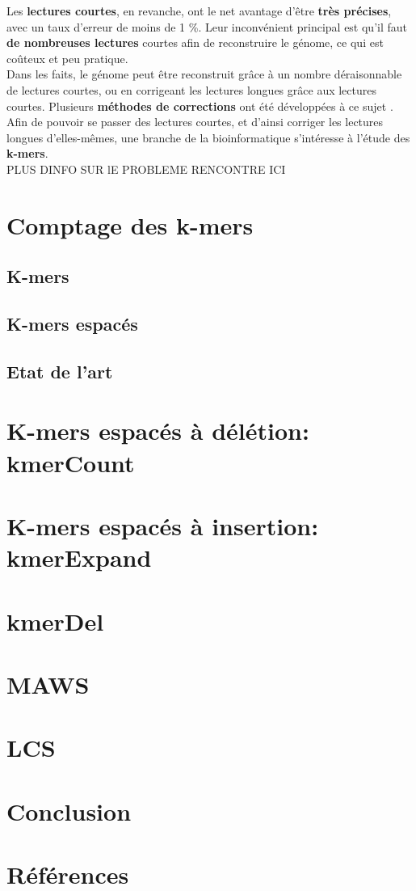 \documentclass{report}
\begin{document}
      Les \textbf{lectures courtes}, en revanche, ont le net avantage d'être \textbf{très précises}, avec un taux d'erreur de moins de 1 \%. Leur inconvénient principal est qu'il faut \textbf{de nombreuses lectures} courtes afin de reconstruire le génome, ce qui est coûteux et peu pratique.\\

      Dans les faits, le génome peut être reconstruit grâce à un nombre déraisonnable de lectures courtes, ou en corrigeant les lectures longues grâce aux lectures courtes. Plusieurs \textbf{méthodes de corrections} ont été développées à ce sujet \cite{Morisse2017}.\\

      Afin de pouvoir se passer des lectures courtes, et d'ainsi corriger les lectures longues d'elles-mêmes, une branche de la bioinformatique s'intéresse à l'étude des \textbf{k-mers}.\\
      PLUS DINFO SUR lE PROBLEME RENCONTRE ICI
    \newpage
  \chapter{Comptage des k-mers}
    \section{K-mers}
    \section{K-mers espacés}
    \section{Etat de l'art}
  \chapter{K-mers espacés à délétion: kmerCount}
    \newpage
  \chapter{K-mers espacés à insertion: kmerExpand}
    \newpage
  \chapter{kmerDel}
    \newpage
  \chapter{MAWS}
    \newpage
  \chapter{LCS}
    \newpage
  \chapter{Conclusion}
    \newpage
  \chapter{Références}
    
    
\end{document}
